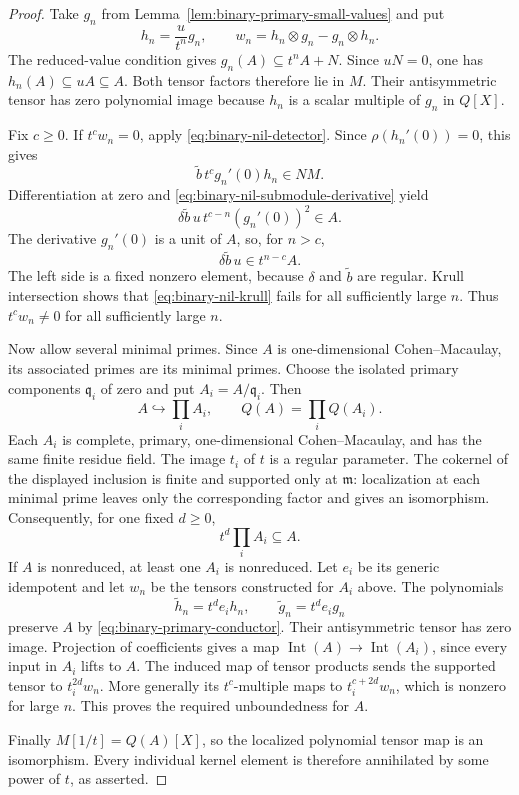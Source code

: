 \begin{proof}
Take $g_n$ from Lemma~\ref{lem:binary-primary-small-values} and put
\[
 h_n=\frac{u}{t^n}g_n,\qquad
 w_n=h_n\otimes g_n-g_n\otimes h_n.
\]
The reduced-value condition gives $g_n(A)\subseteq t^nA+N$.
Since $uN=0$, one has $h_n(A)\subseteq uA\subseteq A$.
Both tensor factors therefore lie in $M$.  Their antisymmetric
tensor has zero polynomial image because $h_n$ is a scalar
multiple of $g_n$ in $Q[X]$.

Fix $c\ge0$.  If $t^cw_n=0$, apply \eqref{eq:binary-nil-detector}.  Since
$\rho(h_n'(0))=0$, this gives
\[
 \widetilde b\,t^c g_n'(0)h_n\in NM.
\]
Differentiation at zero and \eqref{eq:binary-nil-submodule-derivative} yield
\[
 \delta\widetilde b\,u\,t^{c-n}(g_n'(0))^2\in A.
\]
The derivative $g_n'(0)$ is a unit of $A$, so, for $n>c$,
\begin{equation}\label{eq:binary-nil-krull}
 \delta\widetilde b\,u\in t^{n-c}A.                       
\end{equation}
The left side is a fixed nonzero element, because $\delta$ and
$\widetilde b$ are regular.  Krull intersection shows that \eqref{eq:binary-nil-krull}
fails for all sufficiently large $n$.  Thus $t^cw_n\ne0$ for
all sufficiently large $n$.

Now allow several minimal primes.  Since $A$ is one-dimensional
Cohen--Macaulay, its associated primes are its minimal primes.
Choose the isolated primary components $\mathfrak q_i$ of zero
and put $A_i=A/\mathfrak q_i$.  Then
\[
 A\hookrightarrow\prod_iA_i,\qquad
 Q(A)=\prod_iQ(A_i).
\]
Each $A_i$ is complete, primary, one-dimensional Cohen--Macaulay,
and has the same finite residue field.  The image $t_i$ of $t$
is a regular parameter.  The cokernel of the displayed inclusion
is finite and supported only at $\mathfrak m$: localization at
each minimal prime leaves only the corresponding factor and
gives an isomorphism.  Consequently, for one fixed $d\ge0$,
\begin{equation}\label{eq:binary-primary-conductor}
 t^d\prod_iA_i\subseteq A.                               
\end{equation}
If $A$ is nonreduced, at least one $A_i$ is nonreduced.
Let $e_i$ be its generic idempotent and let $w_n$ be the tensors
constructed for $A_i$ above.  The polynomials
\[
 \widetilde h_n=t^de_i h_n,\qquad
 \widetilde g_n=t^de_i g_n
\]
preserve $A$ by \eqref{eq:binary-primary-conductor}.  Their antisymmetric tensor has zero image.
Projection of coefficients gives a map
$\operatorname{Int}(A)\to\operatorname{Int}(A_i)$, since every
input in $A_i$ lifts to $A$.  The induced map of tensor products
sends the supported tensor to $t_i^{2d}w_n$.  More generally its
$t^c$-multiple maps to $t_i^{c+2d}w_n$, which is nonzero for
large $n$.  This proves the required unboundedness for $A$.

Finally $M[1/t]=Q(A)[X]$, so the localized polynomial tensor map
is an isomorphism.  Every individual kernel element is therefore
annihilated by some power of $t$, as asserted.
\end{proof}

